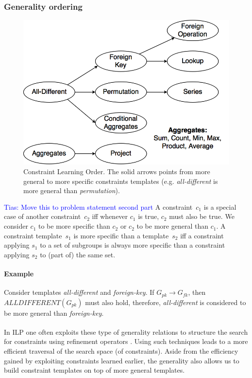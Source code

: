 \documentclass{ecai}
\newcommand{\tias}[1]{\textcolor{blue}{{\sc Tias:} #1}\xspace}
\newcommand{\ecfkey}[2]{\ensuremath{#1 \rightarrow #2}}
\newcommand{\ecalldiff}[1]{\ensuremath{\mathit{ALLDIFFERENT}(#1)}}
\begin{document}
\subsubsection{Generality ordering}

\begin{figure}[tbh]
  \centering
  \includegraphics[width=0.9\linewidth]{figures/constraint_dependency.png}
  \caption{Constraint Learning Order. The solid arrows points from more general to more specific constraints templates (e.g. \textit{all-different} is more general than \textit{permutation}).}
  \label{fig:learning_order}
\end{figure}

\tias{Move this to problem statement second part}
A constraint~$c_1$ is a special case of another constraint~$c_2$ iff whenever $c_1$ is true, $c_2$ must also be true.
We consider $c_1$ to be more specific than $c_2$ or $c_2$ to be more general than $c_1$.
A constraint template~$s_1$ is more specific than a template~$s_2$ iff a constraint applying $s_1$ to a set of subgroups is always more specific than a constraint applying $s_2$ to (part of) the same set.

\paragraph{Example}
Consider templates \textit{all-different} and \textit{foreign-key}.
If \ecfkey{G_{pk}}{G_{fk}}, then \ecalldiff{G_{pk}} must also hold, therefore, \textit{all-different} is considered to be more general than \textit{foreign-key}.
\\\\
In ILP one often exploits these type of generality relations to structure the search for constraints using refinement operators \cite{luc_book}.
Using such techniques leads to a more efficient traversal of the search space (of constraints).
Aside from the efficiency gained by exploiting constraints learned earlier, the generality also allows us to build constraint templates on top of more general templates.
\end{document}
